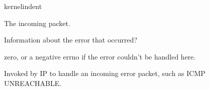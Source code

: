 \documentclass[letterpaper,10pt,english]{sphinxmanual}
\begin{document}
\begin{sphinxuseclass}{kernelindent}
\sphinxAtStartPar
{}
\begin{description}
\sphinxAtStartPar
The incoming packet.

\sphinxAtStartPar
Information about the error that occurred?

\end{description}

\sphinxAtStartPar
{}

\sphinxAtStartPar
zero, or a negative errno if the error couldn’t be handled here.

\end{sphinxuseclass}

\begin{fulllineitems}
\label{\detokenize{mtpimpl.c:c.MTP_err_handler_v6}}
\pysigstartsignatures
\pysigstartmultiline
{}
\pysigstopmultiline
\pysigstopsignatures
\sphinxAtStartPar
Invoked by IP to handle an incoming error packet, such as ICMP UNREACHABLE.

\end{fulllineitems}
\end{document}
